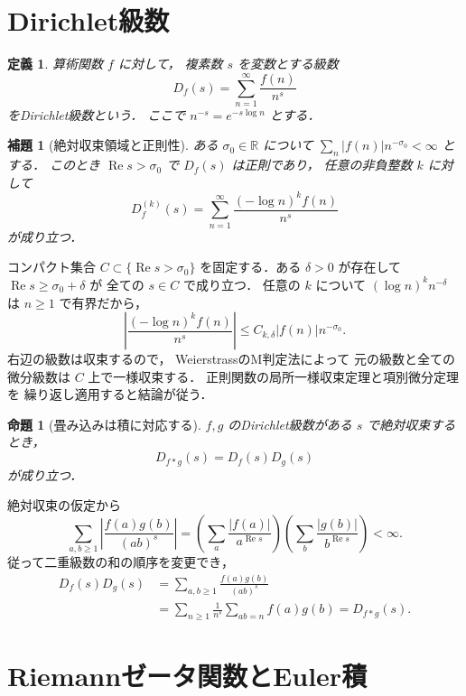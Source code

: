 \documentclass[a5paper,10pt,onecolumn]{jsarticle}
\makeatletter
\theoremstyle{mathnotetheorem}
\newtheorem{definition}[theorem]{定義}
\newtheorem{lemma}[theorem]{補題}
\newtheorem{proposition}[theorem]{命題}
\renewcommand{\proofname}{証明}
\renewenvironment{proof}[1][\proofname]{%
  \par\pushQED{\qed}\normalfont\topsep4\p@\@plus2\p@\relax
  \trivlist\item[\hskip\labelsep\bfseries #1]\ignorespaces
}{\popQED\endtrivlist\@endpefalse}
\makeatother
\begin{document}
\section{Dirichlet級数}

\begin{definition}
算術関数 $f$ に対して，
複素数 $s$ を変数とする級数
\[
 D_f(s)=\sum_{n=1}^\infty\frac{f(n)}{n^s}
\]
を\emph{Dirichlet級数}という．
ここで $n^{-s}=e^{-s\log n}$ とする．
\end{definition}

\begin{lemma}[絶対収束領域と正則性]\label{lem:dirichlet-holo}
ある $\sigma_0\in\mathbb R$ について
$\sum_n|f(n)|n^{-\sigma_0}<\infty$ とする．
このとき $\operatorname{Re}s>\sigma_0$ で
$D_f(s)$ は正則であり，
任意の非負整数 $k$ に対して
\[
 D_f^{(k)}(s)=\sum_{n=1}^\infty
 \frac{(-\log n)^kf(n)}{n^s}
\]
が成り立つ．
\end{lemma}
\begin{proof}
コンパクト集合 $C\subset\{\operatorname{Re}s>\sigma_0\}$
を固定する．ある $\delta>0$ が存在して
$\operatorname{Re}s\ge\sigma_0+\delta$ が
全ての $s\in C$ で成り立つ．
任意の $k$ について
$(\log n)^kn^{-\delta}$ は $n\ge1$ で有界だから，
\[
 \left|\frac{(-\log n)^kf(n)}{n^s}\right|
 \le C_{k,\delta}|f(n)|n^{-\sigma_0}.
\]
右辺の級数は収束するので，
WeierstrassのM判定法によって
元の級数と全ての微分級数は
$C$ 上で一様収束する．
正則関数の局所一様収束定理と項別微分定理を
繰り返し適用すると結論が従う．
\end{proof}

\begin{proposition}[畳み込みは積に対応する]\label{prop:series-product}
$f,g$ のDirichlet級数がある $s$ で絶対収束するとき，
\[
 D_{f*g}(s)=D_f(s)D_g(s)
\]
が成り立つ．
\end{proposition}
\begin{proof}
絶対収束の仮定から
\[
 \sum_{a,b\ge1}
 \left|\frac{f(a)g(b)}{(ab)^s}\right|
 =\left(\sum_a\frac{|f(a)|}{a^{\operatorname{Re}s}}\right)
  \left(\sum_b\frac{|g(b)|}{b^{\operatorname{Re}s}}\right)
 <\infty.
\]
従って二重級数の和の順序を変更でき，
\begin{align*}
 D_f(s)D_g(s)
 &=\sum_{a,b\ge1}\frac{f(a)g(b)}{(ab)^s}\\
 &=\sum_{n\ge1}\frac1{n^s}
   \sum_{ab=n}f(a)g(b)
 =D_{f*g}(s).
\end{align*}
\end{proof}

\section{Riemannゼータ関数とEuler積}
\end{document}
